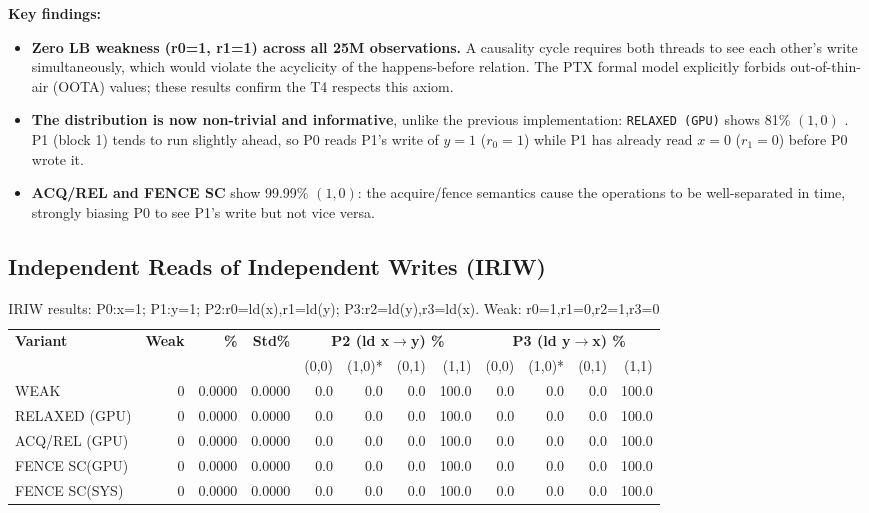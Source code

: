 \documentclass[a4paper]{article}
\begin{document}
\textbf{Key findings:}
\begin{itemize}
  \item \textbf{Zero LB weakness (r0=1, r1=1) across all 25M observations.}
    A causality cycle requires both threads to see each other's write simultaneously, which would violate the acyclicity of the happens-before relation. The PTX formal model \cite{Lustig2019PTX} explicitly forbids out-of-thin-air (OOTA) values; these results confirm the T4 respects this axiom.
  \item \textbf{The distribution is now non-trivial and informative}, unlike the previous implementation:
    \texttt{RELAXED (GPU)} shows 81\% $(1,0)$ . P1 (block 1) tends to run slightly ahead, so P0 reads P1's write of $y=1$ ($r_0=1$) while P1 has already read $x=0$ ($r_1=0$) before P0 wrote it.
  \item \textbf{ACQ/REL and FENCE SC} show 99.99\% $(1,0)$: the acquire/fence semantics cause the operations to be well-separated in time, strongly biasing P0 to see P1's write but not vice versa.
\end{itemize}

\subsection{Independent Reads of Independent Writes (IRIW)}

\begin{table}[H]
\centering
\small
\caption{IRIW results: P0:x=1; P1:y=1; P2:r0=ld(x),r1=ld(y); P3:r2=ld(y),r3=ld(x). Weak: r0=1,r1=0,r2=1,r3=0}
\label{tab:iriw-results}
\begin{tabular}{l|r r r | r r r r | r r r r}
\toprule
\textbf{Variant} & \textbf{Weak} & \textbf{\%} & \textbf{Std\%}
  & \multicolumn{4}{c|}{\textbf{P2 (ld x$\to$y) \%}}
  & \multicolumn{4}{c}{\textbf{P3 (ld y$\to$x) \%}} \\
& & & & (0,0) & (1,0)* & (0,1) & (1,1) & (0,0) & (1,0)* & (0,1) & (1,1) \\
\midrule
WEAK         & 0 & 0.0000 & 0.0000 & 0.0 & 0.0 & 0.0 & 100.0 & 0.0 & 0.0 & 0.0 & 100.0 \\
RELAXED (GPU)& 0 & 0.0000 & 0.0000 & 0.0 & 0.0 & 0.0 & 100.0 & 0.0 & 0.0 & 0.0 & 100.0 \\
ACQ/REL (GPU)& 0 & 0.0000 & 0.0000 & 0.0 & 0.0 & 0.0 & 100.0 & 0.0 & 0.0 & 0.0 & 100.0 \\
FENCE SC(GPU)& 0 & 0.0000 & 0.0000 & 0.0 & 0.0 & 0.0 & 100.0 & 0.0 & 0.0 & 0.0 & 100.0 \\
FENCE SC(SYS)& 0 & 0.0000 & 0.0000 & 0.0 & 0.0 & 0.0 & 100.0 & 0.0 & 0.0 & 0.0 & 100.0 \\
\bottomrule
\end{tabular}
\end{table}
\end{document}
